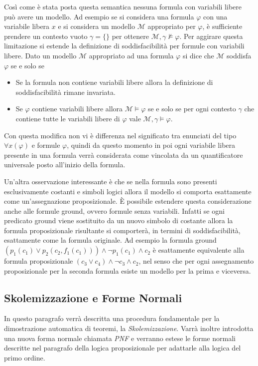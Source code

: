 \documentclass[./main.tex]{subfiles}
\begin{document}
Così come è stata posta questa semantica nessuna formula con variabili libere può avere un modello.
Ad esempio se si considera una formula $\varphi$ con una variabile libera $x$ e si considera un modello $\mathcal{M}$ appropriato per $\varphi$,
è sufficiente prendere un contesto vuoto $\gamma = \{\}$ per ottenere $\mathcal{M}, \gamma \not\models \varphi$.
Per aggirare questa limitazione si estende la definizione di soddisfacibilità per formule con variabili libere.
Dato un modello $\mathcal{M}$ appropriato ad una formula $\varphi$ si dice che $\mathcal{M}$ soddisfa $\varphi$ se e solo se
\begin{itemize}
  \item Se la formula non contiene variabili libere allora la definizione di soddisfacibilità rimane invariata.
  \item Se $\varphi$ contiene variabili libere allora $\mathcal{M} \models \varphi$ se e solo se
  per ogni contesto $\gamma$ che contiene tutte le variabili libere di $\varphi$ vale $\mathcal{M}, \gamma \models \varphi$.
\end{itemize}

Con questa modifica non vi è differenza nel significato tra enunciati del tipo $\forall x (\varphi)$ e formule $\varphi$,
quindi da questo momento in poi ogni variabile libera presente in una formula verrà considerata come vincolata da un quantificatore universale posto all'inizio della formula.

Un'altra osservazione interessante è che se nella formula sono presenti esclusivamente costanti e simboli logici allora il modello si comporta 
esattamente come un'assegnazione proposizionale. È possibile estendere questa considerazione anche alle formule ground, ovvero formule senza variabili.
Infatti se ogni predicato ground viene sostituito da un nuovo simbolo di costante allora la formula proposizionale risultante si comporterà, in termini di soddisfacibilità,
esattamente come la formula originale. Ad esempio la formula ground $(p_1(c_1) \lor p_2(c_2, f_1(c_1))) \land \lnot p_1(c_1) \land c_2$ 
è esattamente equivalente alla formula proposizionale $(c_3 \lor c_4) \land \lnot c_3 \land c_2$, nel senso che per ogni assegnamento proposizionale per la seconda formula
esiste un modello per la prima e viceversa.


\subsection{Skolemizzazione e Forme Normali}
In questo paragrafo verrà descritta una procedura fondamentale per la dimostrazione automatica di teoremi, la \textit{Skolemizzazione}. Varrà inoltre introdotta
una nuova forma normale chiamata \textit{PNF} e verranno
estese le forme normali descritte nel paragrafo della logica proposizionale per adattarle alla logica del primo ordine.
\end{document}
